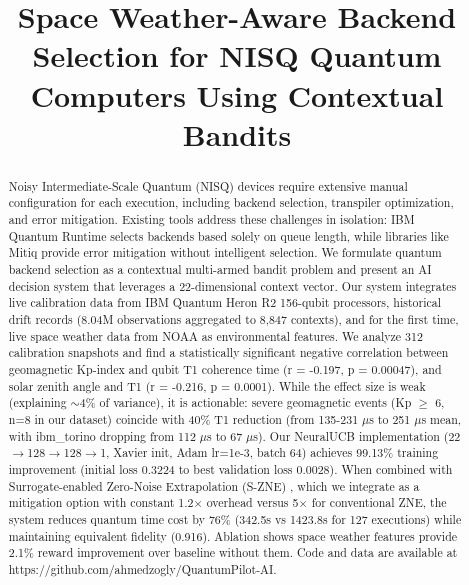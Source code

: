 \documentclass[conference]{IEEEtran}
\begin{document}
\title{Space Weather-Aware Backend Selection for NISQ Quantum Computers Using Contextual Bandits}

\author{
}

\maketitle

\begin{abstract}
Noisy Intermediate-Scale Quantum (NISQ) devices require extensive manual configuration for each execution, including backend selection, transpiler optimization, and error mitigation. Existing tools address these challenges in isolation: IBM Quantum Runtime selects backends based solely on queue length, while libraries like Mitiq provide error mitigation without intelligent selection. We formulate quantum backend selection as a contextual multi-armed bandit problem and present an AI decision system that leverages a 22-dimensional context vector. Our system integrates live calibration data from IBM Quantum Heron R2 156-qubit processors, historical drift records (8.04M observations aggregated to 8,847 contexts), and for the first time, live space weather data from NOAA as environmental features. We analyze 312 calibration snapshots and find a statistically significant negative correlation between geomagnetic Kp-index and qubit T1 coherence time (r = -0.197, p = 0.00047), and solar zenith angle and T1 (r = -0.216, p = 0.0001). While the effect size is weak (explaining $\sim$4\% of variance), it is actionable: severe geomagnetic events (Kp $\ge$ 6, n=8 in our dataset) coincide with 40\% T1 reduction (from 135-231 $\mu$s to 251 $\mu$s mean, with ibm\_torino dropping from 112 $\mu$s to 67 $\mu$s). Our NeuralUCB implementation (22$\rightarrow$128$\rightarrow$128$\rightarrow$1, Xavier init, Adam lr=1e-3, batch 64) achieves 99.13\% training improvement (initial loss 0.3224 to best validation loss 0.0028). When combined with Surrogate-enabled Zero-Noise Extrapolation (S-ZNE) \cite{liao2024surrogate}, which we integrate as a mitigation option with constant 1.2$\times$ overhead versus 5$\times$ for conventional ZNE, the system reduces quantum time cost by 76\% (342.5s vs 1423.8s for 127 executions) while maintaining equivalent fidelity (0.916). Ablation shows space weather features provide 2.1\% reward improvement over baseline without them. Code and data are available at https://github.com/ahmedzogly/QuantumPilot-AI.
\end{abstract}
\end{document}
